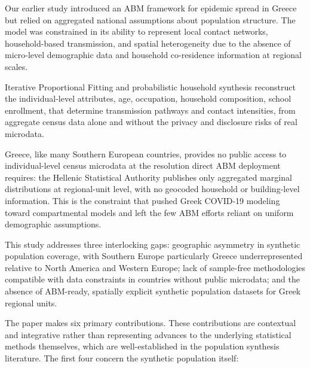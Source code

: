 \documentclass{article}
\begin{document}
Our earlier study \citep{thomopoulos2024agent} introduced an ABM framework for epidemic spread in Greece but relied on aggregated national assumptions about population structure. The model was constrained in its ability to represent local contact networks, household-based transmission, and spatial heterogeneity due to the absence of micro-level demographic data and household co-residence information at regional scales.

Iterative Proportional Fitting and probabilistic household synthesis reconstruct the individual-level attributes, age, occupation, household composition, school enrollment, that determine transmission pathways and contact intensities, from aggregate census data alone and without the privacy and disclosure risks of real microdata.

Greece, like many Southern European countries, provides no public access to individual-level census microdata at the resolution direct ABM deployment requires: the Hellenic Statistical Authority publishes only aggregated marginal distributions at regional-unit level, with no geocoded household or building-level information. This is the constraint that pushed Greek COVID-19 modeling toward compartmental models and left the few ABM efforts reliant on uniform demographic assumptions.

This study addresses three interlocking gaps: geographic asymmetry in synthetic population coverage, with Southern Europe particularly Greece underrepresented relative to North America and Western Europe; lack of sample-free methodologies compatible with data constraints in countries without public microdata; and the absence of ABM-ready, spatially explicit synthetic population datasets for Greek regional units.

The paper makes six primary contributions. These contributions are contextual and integrative rather than representing advances to the underlying statistical methods themselves, which are well-established in the population synthesis literature. The first four concern the synthetic population itself:
\end{document}

